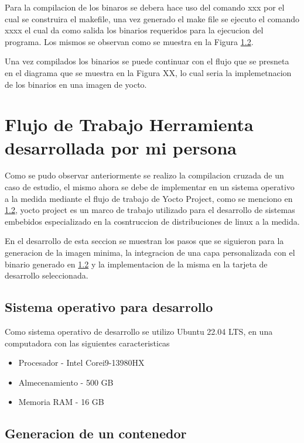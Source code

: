 Para la compilacion de los binaros se debera hace uso del comando xxx por el cual se construira el makefile, una vez generado el make file se ejecuto el comando xxxx el cual da como salida los binarios requeridos para la ejecucion del programa. Los mismos se observan como se muestra en la Figura \ref{}. 

Una vez compilados los binarios se puede continuar con el flujo que se presneta en el diagrama que se muestra en la Figura XX, lo cual seria la implemetnacion de los binarios en una imagen de yocto.


\section{Flujo de Trabajo Herramienta desarrollada por mi persona}

Como se pudo observar anteriormente se realizo la compilacion cruzada de un caso de estudio, el mismo ahora se debe de implementar en un sistema operativo a la medida mediante el flujo de trabajo de Yocto Project, como se menciono en \ref{}, yocto project es un marco de trabajo utilizado para el desarrollo de sistemas embebidos especializado en la cosntruccion de distribuciones de linux a la medida. 

En el desarrollo de esta seccion se muestran los pasos que se siguieron para la generacion de la imagen minima, la integracion de una capa personalizada con el binario generado en \ref{} y la implementacion de la misma en la tarjeta de desarrollo seleccionada.

\subsection{Sistema operativo para desarrollo}

Como sistema operativo de desarrollo se utilizo Ubuntu 22.04 LTS, en una computadora con las siguientes caracteristicas 

\begin{itemize}
    \item Procesador - Intel Corei9-13980HX 
    \item Almecenamiento - 500 GB
    \item Memoria RAM - 16 GB 
\end{itemize}

\subsection{Generacion de un contenedor}

